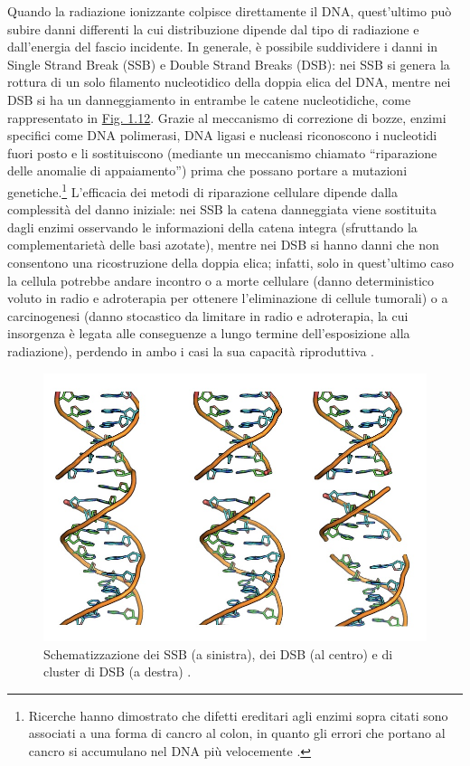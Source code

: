 \documentclass[12pt,a4paper,twoside]{report}
\begin{document}
	Quando la radiazione ionizzante colpisce direttamente il DNA, quest'ultimo può subire danni differenti la cui distribuzione dipende dal tipo di radiazione e dall'energia del fascio incidente. In generale, è possibile suddividere i danni in Single Strand Break (SSB) e Double Strand Breaks (DSB): nei SSB si genera la rottura di un solo filamento nucleotidico della doppia elica del DNA, mentre nei DSB si ha un danneggiamento in entrambe le catene nucleotidiche, come rappresentato in \hyperref[fig:danni_dna]{Fig. 1.12}. Grazie al meccanismo di correzione di bozze, enzimi specifici come DNA polimerasi, DNA ligasi e nucleasi riconoscono i nucleotidi fuori posto e li sostituiscono (mediante un meccanismo chiamato ``riparazione delle anomalie di appaiamento'') prima che possano portare a mutazioni genetiche.\footnote{Ricerche hanno dimostrato che difetti ereditari agli enzimi sopra citati sono associati a una forma di cancro al colon, in quanto gli errori che portano al cancro si accumulano nel DNA più velocemente \cite{campbell2anno}.} L'efficacia dei metodi di riparazione cellulare dipende dalla complessità del danno iniziale: nei SSB la catena danneggiata viene sostituita dagli enzimi osservando le informazioni della catena integra (sfruttando la complementarietà delle basi azotate), mentre nei DSB si hanno danni che non consentono una ricostruzione della doppia elica; infatti, solo in quest'ultimo caso la cellula potrebbe andare incontro o a morte cellulare (danno deterministico voluto in radio e adroterapia per ottenere l'eliminazione di cellule tumorali) o a carcinogenesi (danno stocastico da limitare in radio e adroterapia, la cui insorgenza è legata alle conseguenze a lungo termine dell'esposizione alla radiazione), perdendo in ambo i casi la sua capacità riproduttiva \cite{unipv_conference}.
	\begin{figure}[H]
		\centering
		\includegraphics[width=0.9\linewidth]{danni_dna.jpg}
		\caption{Schematizzazione dei SSB (a sinistra), dei DSB (al centro) e di cluster di DSB (a destra) \cite{unipv_conference}.}
		\label{fig:danni_dna}
	\end{figure}
	
\end{document}
